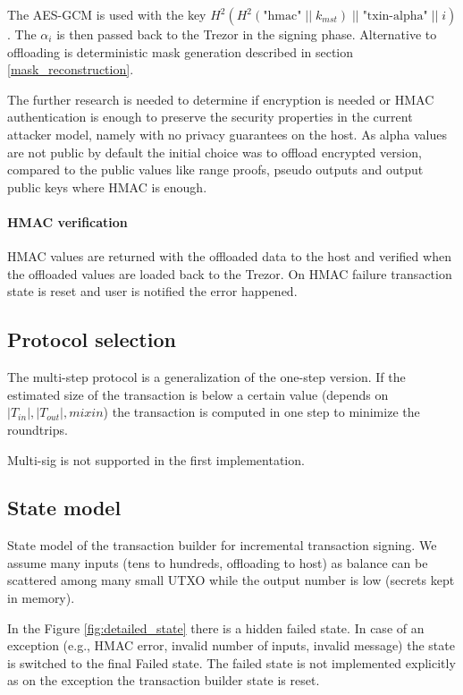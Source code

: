 \documentclass[]{article}
\begin{document}
The AES-GCM is used with the key $H^2\left(H^2\left(\text{"hmac"} \; || \; k_{mst}\right) \; || \; \text{"txin-alpha"} \; || \; i\right)$. The $\alpha_i$ is then passed back to the Trezor in the signing phase. Alternative to offloading is deterministic mask generation described in section \ref{mask_reconstruction}.

The further research is needed to determine if encryption is needed or HMAC authentication is enough to preserve the security properties in the current attacker model, namely with no privacy guarantees on the host. As alpha values are not public by default the initial choice was to offload encrypted version, compared to the public values like range proofs, pseudo outputs and output public keys where HMAC is enough.

\paragraph{HMAC verification}
HMAC values are returned with the offloaded data to the host and verified when the offloaded values are loaded back to the Trezor. 
On HMAC failure transaction state is reset and user is notified the error happened.

\subsection{Protocol selection}
The multi-step protocol is a generalization of the one-step version.
If the estimated size of the transaction is below a certain value (depends on $|T_{in}|, |T_{out}|, mixin$) the transaction is computed in one step to minimize the roundtrips. 

Multi-sig is not supported in the first implementation.

\subsection{State model}

State model of the transaction builder for incremental transaction signing. We assume many inputs (tens to hundreds, offloading to host) as balance can be scattered among many small UTXO while the output number is low (secrets kept in memory).

In the Figure \ref{fig:detailed_state} there is a hidden failed state. In case of an exception (e.g., HMAC error, invalid number of inputs, invalid message) the state is switched to the final Failed state. The failed state is not implemented explicitly as on the exception the transaction builder state is reset.
\end{document}
